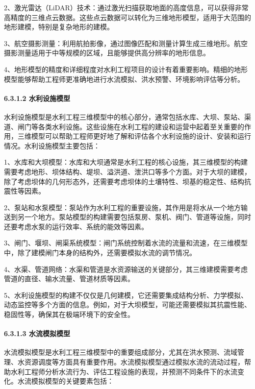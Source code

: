 2、激光雷达（LiDAR）技术：通过激光扫描获取地面的高度信息，可以获得非常高精度的三维点云数据。这些点云数据可以转化为三维地形模型，适用于大范围的地形建模，特别是复杂地形的建模。

3、航空摄影测量：利用航拍影像，通过图像匹配和测量计算生成三维地形。航空摄影测量适用于中等规模的区域，且能够提供高分辨率的地形信息。

4、地形模型的精度和详细程度对水利工程项目的设计有着重要影响。精细的地形模型能够帮助工程师更准确地进行水流模拟、洪水预警、环境影响评估等分析。

\paragraph{6.3.1.2 水利设施模型}\label{ux6c34ux5229ux8bbeux65bdux6a21ux578b}

水利设施模型是水利工程三维模型中的核心部分，通常包括水库、大坝、泵站、渠道、闸门等各类水利设施。这些设施在水利工程的建设和运营中起着至关重要的作用，三维模型可以帮助工程师更好地了解和评估各个水利设施的设计、安装和运行情况。水利设施模型主要包括：

1、水库和大坝模型：水库和大坝通常是水利工程的核心设施，其三维模型的构建需要考虑地形、坝体结构、堤坝、溢洪道、泄洪口等多个方面。对于大坝的建模，除了考虑坝体的几何形态外，还需要考虑坝体的土壤特性、坝基的稳定性、结构抗震性等因素。

2、泵站和水泵模型：泵站作为水利工程的重要设施，其作用是将水从一个地方输送到另一个地方。泵站模型的构建需要包括泵房、泵机、阀门、管道等设施，同时还要考虑水泵的运行效率、系统的能效等因素。

3、闸门、堰坝、闸渠系统模型：闸门系统控制着水流的流量和流速，在三维模型中，除了建模闸门本身的结构外，还需要模拟水流的调节情况。

4、水渠、管道网络：水渠和管道是水资源输送的关键部分，其三维建模需要考虑管道的直径、输水流量、管道材质等因素。

5、水利设施模型的构建不仅仅是几何建模，它还需要集成结构分析、力学模拟、动态监控等多个方面的信息。例如，对于大坝模型，可能还需要模拟其抗震性能、稳固性等，确保其在极端环境下的安全性。

\paragraph{6.3.1.3 水流模拟模型}\label{ux6c34ux6d41ux6a21ux62dfux6a21ux578b}

水流模拟模型是水利工程三维模型中的重要组成部分，尤其在洪水预测、流域管理、水资源调度等方面具有重要作用。水流模拟模型通过模拟水流的流动过程，帮助水利工程师分析水流行为、评估工程设施的表现，并预测不同条件下的水流变化。水流模拟模型的关键要素包括：

